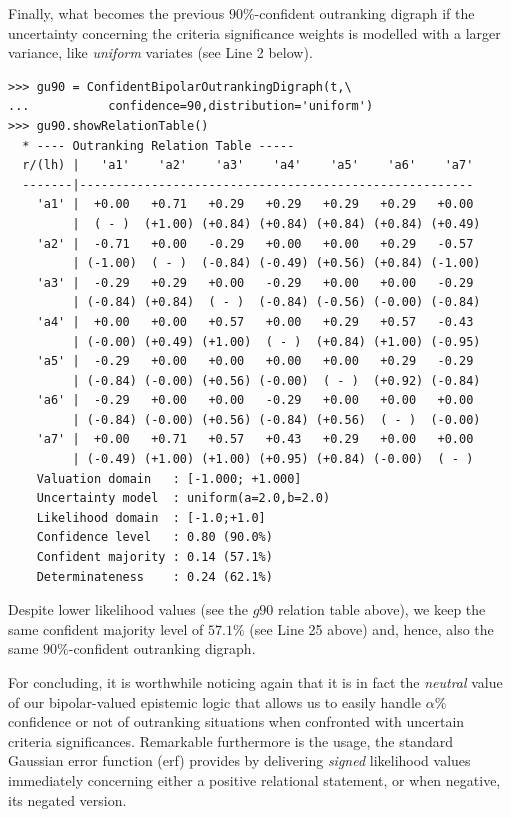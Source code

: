 Finally, what becomes the previous $90\%$-confident outranking digraph if the uncertainty concerning the criteria significance weights is modelled with a larger variance, like \emph{uniform} variates (see Line 2 below).
\begin{lstlisting}[basicstyle=\scriptsize]
>>> gu90 = ConfidentBipolarOutrankingDigraph(t,\
...           confidence=90,distribution='uniform')
>>> gu90.showRelationTable()
  * ---- Outranking Relation Table -----
  r/(lh) |   'a1'    'a2'    'a3'    'a4'    'a5'    'a6'    'a7'	 
  -------|-------------------------------------------------------
    'a1' |  +0.00   +0.71   +0.29   +0.29   +0.29   +0.29   +0.00  
         |  ( - )  (+1.00) (+0.84) (+0.84) (+0.84) (+0.84) (+0.49) 
    'a2' |  -0.71   +0.00   -0.29   +0.00   +0.00   +0.29   -0.57  
         | (-1.00)  ( - )  (-0.84) (-0.49) (+0.56) (+0.84) (-1.00) 
    'a3' |  -0.29   +0.29   +0.00   -0.29   +0.00   +0.00   -0.29  
         | (-0.84) (+0.84)  ( - )  (-0.84) (-0.56) (-0.00) (-0.84) 
    'a4' |  +0.00   +0.00   +0.57   +0.00   +0.29   +0.57   -0.43  
         | (-0.00) (+0.49) (+1.00)  ( - )  (+0.84) (+1.00) (-0.95) 
    'a5' |  -0.29   +0.00   +0.00   +0.00   +0.00   +0.29   -0.29  
         | (-0.84) (-0.00) (+0.56) (-0.00)  ( - )  (+0.92) (-0.84) 
    'a6' |  -0.29   +0.00   +0.00   -0.29   +0.00   +0.00   +0.00  
         | (-0.84) (-0.00) (+0.56) (-0.84) (+0.56)  ( - )  (-0.00) 
    'a7' |  +0.00   +0.71   +0.57   +0.43   +0.29   +0.00   +0.00  
         | (-0.49) (+1.00) (+1.00) (+0.95) (+0.84) (-0.00)  ( - )  
    Valuation domain   : [-1.000; +1.000] 
    Uncertainty model  : uniform(a=2.0,b=2.0) 
    Likelihood domain  : [-1.0;+1.0] 
    Confidence level   : 0.80 (90.0%) 
    Confident majority : 0.14 (57.1%) 
    Determinateness    : 0.24 (62.1%)
\end{lstlisting}

Despite lower likelihood values (see the $g90$ relation table above), we keep the same confident majority level of $57.1\%$ (see Line 25 above) and, hence, also the same $90\%$-confident outranking digraph.

For concluding, it is worthwhile noticing again that it is in fact the \emph{neutral} value of our bipolar-valued epistemic logic that allows us to easily handle $\alpha\%$ confidence or not of outranking situations when confronted with uncertain criteria significances. Remarkable furthermore is the usage, the standard Gaussian error function (erf) provides by delivering \emph{signed} likelihood values immediately concerning either a positive relational statement, or when negative, its negated version. 
 
